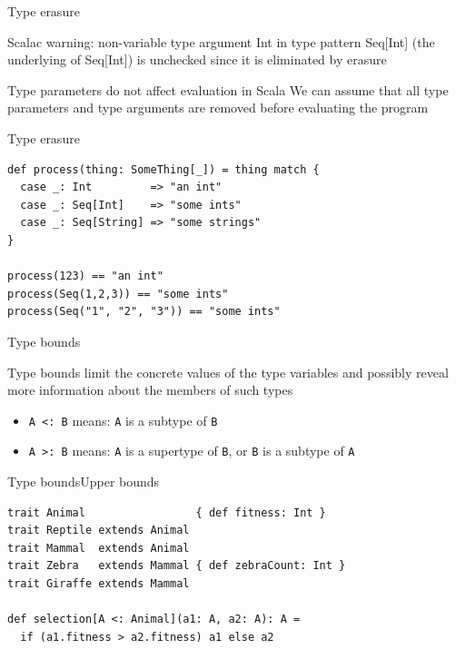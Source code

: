 \documentclass[aspectratio=169]{beamer}
\begin{document}
\begin{frame}{Type erasure}
\begin{block}{Scalac warning:}
\ttfamily non-variable type argument Int in type pattern Seq[Int] (the underlying
of Seq[Int]) is unchecked since it is eliminated by erasure
\end{block}
\vspace{2em}
\pause
\begin{block}{Type parameters do not affect evaluation in Scala}
  We can assume that all type parameters and type arguments are removed before evaluating the
  program
\end{block}
\end{frame}

\begin{frame}[fragile]{Type erasure}
\begin{verbatim}
def process(thing: SomeThing[_]) = thing match {
  case _: Int         => "an int"
  case _: Seq[Int]    => "some ints"
  case _: Seq[String] => "some strings"
}

process(123) == "an int"
process(Seq(1,2,3)) == "some ints"
process(Seq("1", "2", "3")) == "some ints"
\end{verbatim}
\end{frame}

\begin{frame}{Type bounds}
\vspace{-2em}
\begin{block}{}
   Type bounds limit the concrete values of the type variables and possibly reveal \alert{more} information
   about the members of such types
\end{block}
\begin{itemize}
  \item \texttt{A <: B} means: \texttt{A} is a subtype of \texttt{B}
  \item \texttt{A >: B} means: \texttt{A} is a supertype of \texttt{B}, or \texttt{B} is a subtype
    of \texttt{A}
\end{itemize}
\end{frame}

\begin{frame}[fragile]{Type bounds}{Upper bounds}
\begin{verbatim}
trait Animal                 { def fitness: Int }
trait Reptile extends Animal
trait Mammal  extends Animal
trait Zebra   extends Mammal { def zebraCount: Int }
trait Giraffe extends Mammal

def selection[A <: Animal](a1: A, a2: A): A =
  if (a1.fitness > a2.fitness) a1 else a2
\end{verbatim}
\end{frame}
\end{document}
